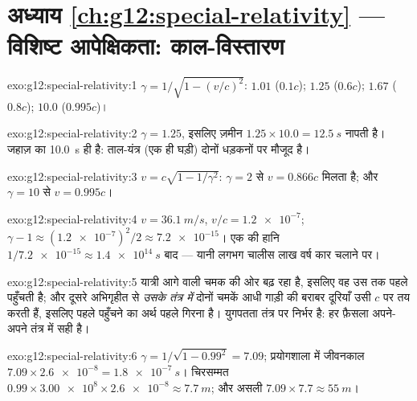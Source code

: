 \section*{अध्याय \ref{ch:g12:special-relativity} --- विशिष्ट आपेक्षिकता: काल-विस्तारण}

\begin{solution}{exo:g12:special-relativity:1}
$\gamma = 1/\sqrt{1 - (v/c)^2}$: $1.01$ ($0.1c$); $1.25$ ($0.6c$); $1.67$ ($0.8c$); $10.0$ ($0.995c$)।
\end{solution}

\begin{solution}{exo:g12:special-relativity:2}
$\gamma = 1.25$, इसलिए ज़मीन $1.25 \times 10.0 =
\qty{12.5}{s}$ नापती है। जहाज़ का \qty{10.0}{s} ही  है:
ताल-यंत्र (एक ही घड़ी) दोनों धड़कनों पर मौजूद है।
\end{solution}

\begin{solution}{exo:g12:special-relativity:3}
$v = c\sqrt{1 - 1/\gamma^2}$: $\gamma = 2$ से $v = 0.866c$ मिलता है; और $\gamma = 10$ से $v = 0.995c$।
\end{solution}

\begin{solution}{exo:g12:special-relativity:4}
$v = \qty{36.1}{m/s}$, $v/c = \num{1.2e-7}$; $\gamma - 1 \approx (\num{1.2e-7})^2/2 \approx \num{7.2e-15}$। एक  की हानि $1/\num{7.2e-15} \approx \qty{1.4e14}{s}$ बाद --- यानी लगभग चालीस लाख
वर्ष कार चलाने पर।
\end{solution}

\begin{solution}{exo:g12:special-relativity:5}
यात्री आगे वाली चमक की ओर बढ़ रहा है, इसलिए वह उस तक पहले पहुँचती है; और दूसरे
अभिगृहीत से \emph{उसके तंत्र में} दोनों चमकें आधी गाड़ी की बराबर दूरियाँ उसी
$c$ पर तय करती हैं, इसलिए पहले पहुँचने का अर्थ पहले गिरना है। युगपतता तंत्र
पर निर्भर है: हर फ़ैसला अपने-अपने तंत्र में सही है।
\end{solution}

\begin{solution}{exo:g12:special-relativity:6}
$\gamma = 1/\sqrt{1 - 0.99^2} = 7.09$; प्रयोगशाला में जीवनकाल $7.09 \times \num{2.6e-8} = \qty{1.8e-7}{s}$। चिरसम्मत  $0.99 \times \num{3.00e8} \times \num{2.6e-8} \approx \qty{7.7}{m}$; और असली
$7.09 \times 7.7 \approx \qty{55}{m}$।
\end{solution}

